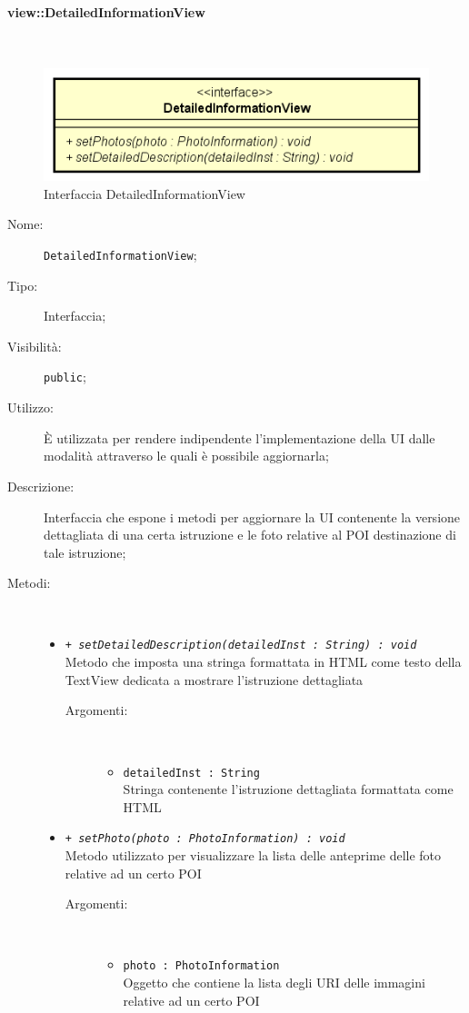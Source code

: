 \documentclass[../DefinizioneDiProdotto.tex]{subfiles}
\begin{document}
\paragraph{view::DetailedInformationView}
\
\begin{figure}[H]
	\centering
	\includegraphics[width=\maxwidth]{img/DetailedInformationView.png}
	\caption{Interfaccia DetailedInformationView}\label{fig:view::DetailedInformationView} 
\end{figure}
\begin{description}
	\item[Nome:] \texttt{DetailedInformationView};
	\item[Tipo:] Interfaccia;
	\item[Visibilità:] \texttt{public};
	\item[Utilizzo:] È utilizzata per rendere indipendente l'implementazione della UI dalle modalità attraverso le quali è possibile aggiornarla;
	\item[Descrizione:] Interfaccia che espone i metodi per aggiornare la UI contenente la versione dettagliata di una certa istruzione e le foto relative al POI destinazione di tale istruzione;
	\item[Metodi:] \
	\begin{itemize}
		\item \texttt{+ \textit{setDetailedDescription(detailedInst : String) : void}}\\
		Metodo che imposta una stringa formattata in HTML come testo della TextView dedicata a mostrare l'istruzione dettagliata
		\begin{description}
			\item[Argomenti:] \
			\begin{itemize}
				\item \texttt{detailedInst : String}\\
				Stringa contenente l'istruzione dettagliata formattata come HTML\end{itemize}
		\end{description}
		\item \texttt{+ \textit{setPhoto(photo : PhotoInformation) : void}}\\
		Metodo utilizzato per visualizzare la lista delle anteprime delle foto relative ad un certo POI
		\begin{description}
			\item[Argomenti:] \
			\begin{itemize}
				\item \texttt{photo : PhotoInformation}\\
				Oggetto che contiene la lista degli URI delle immagini relative ad un certo POI\end{itemize}
		\end{description}
	\end{itemize}
\end{description}
\end{document}
